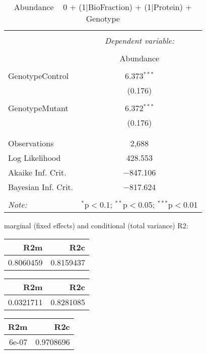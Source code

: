 \documentclass[11pt]{report}
\begin{document}
\begin{table}[!htbp] \centering 
  \caption{Abundance ~ 0 + (1|BioFraction) + (1|Protein) + Genotype} 
  \label{} 
\begin{tabular}{@{\extracolsep{5pt}}lc} 
\\[-1.8ex]\hline 
\hline \\[-1.8ex] 
 & \multicolumn{1}{c}{\textit{Dependent variable:}} \\ 
\cline{2-2} 
\\[-1.8ex] & Abundance \\ 
\hline \\[-1.8ex] 
 GenotypeControl & 6.373$^{***}$ \\ 
  & (0.176) \\ 
  & \\ 
 GenotypeMutant & 6.372$^{***}$ \\ 
  & (0.176) \\ 
  & \\ 
\hline \\[-1.8ex] 
Observations & 2,688 \\ 
Log Likelihood & 428.553 \\ 
Akaike Inf. Crit. & $-$847.106 \\ 
Bayesian Inf. Crit. & $-$817.624 \\ 
\hline 
\hline \\[-1.8ex] 
\textit{Note:}  & \multicolumn{1}{r}{$^{*}$p$<$0.1; $^{**}$p$<$0.05; $^{***}$p$<$0.01} \\ 
\end{tabular} 
\end{table} 
marginal (fixed effects) and conditional (total variance) R2:

\begin{tabular}{r|r}
\hline
R2m & R2c\\
\hline
0.8060459 & 0.8159437\\
\hline
\end{tabular}

\begin{tabular}{r|r}
\hline
R2m & R2c\\
\hline
0.0321711 & 0.8281085\\
\hline
\end{tabular}

\begin{tabular}{r|r}
\hline
R2m & R2c\\
\hline
6e-07 & 0.9708696\\
\hline
\end{tabular}
\end{document}
